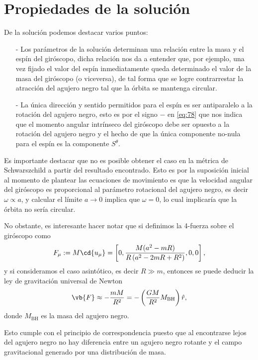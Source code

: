 \newpage
\section{Propiedades de la solución}

De la solución podemos destacar varios puntos:
\begin{itemize}
\item[-] Los parámetros de la solución determinan una relación entre la masa y el espín del giróscopo, dicha relación nos da a entender que, por ejemplo, una vez fijado el valor del espín inmediatamente queda determinado el valor de la masa del giróscopo (o viceversa), de tal forma que se logre contrarrestar la atracción del agujero negro tal que la órbita se mantenga circular.
\item[-] La única dirección y sentido permitidos para el espín es ser antiparalelo a la rotación del agujero negro, esto es por el signo $-$ en \eqref{eq:78} que nos indica que el momento angular intrínseco del giróscopo debe ser opuesto a la rotación del agujero negro y el hecho de que la única componente no-nula para el espín es la componente $S^{\theta}$.
\end{itemize}

Es importante destacar que no es posible obtener el caso en la métrica de Schwarszchild a partir del resultado encontrado. Esto es por la suposición inicial al momento de plantear las ecuaciones de movimiento es que la velocidad angular del giróscopo es proporcional al parámetro rotacional del agujero negro, es decir $\omega \propto a$, y calcular el límite $a \rightarrow 0$ implica que $\omega = 0$, lo cual implicaría que la órbita no sería circular.

No obstante, es interesante hacer notar que si definimos la 4-fuerza sobre el giróscopo como
\begin{equation}
\label{eq:124}
F_{\mu} := M \cd{u_{\mu}} = \left[ 0, \frac{M(a^2 - mR)}{R\left( a^2 - 2mR + R^2  \right)},0,0 \right],
\end{equation}
y si consideramos el caso asintótico, es decir $R \gg m $, entonces se puede deducir la ley de gravitación universal de Newton
\begin{equation}
\vb{F} \approx -\frac{mM}{R^2} = -\left( \frac{GM}{R^2} M_{\mathrm{BH}} \right) \hat{r},
\end{equation}
donde $M_{\mathrm{BH}}$ es la masa del agujero negro.

Esto cumple con el principio de correspondencia puesto que al encontrarse lejos del agujero negro no hay diferencia entre un agujero negro rotante y el campo gravitacional generado por una distribución de masa. 

